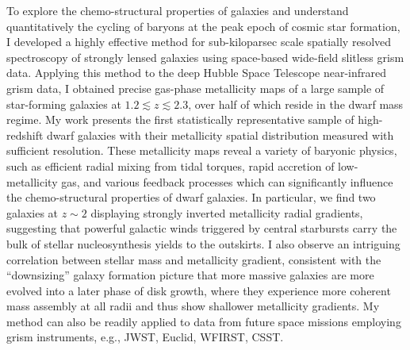 
To explore the chemo-structural properties of galaxies and understand quantitatively the cycling of baryons at
the peak epoch of cosmic star formation, I developed a highly effective method for sub-kiloparsec scale spatially
resolved spectroscopy of strongly lensed galaxies using space-based wide-field slitless grism data. Applying this
method to the deep Hubble Space Telescope near-infrared grism data, I obtained precise gas-phase metallicity maps
of a large sample of star-forming galaxies at $1.2\lesssim z\lesssim2.3$, over half of which reside in the dwarf
mass regime.  My work presents the first statistically representative sample of high-redshift dwarf galaxies with
their metallicity spatial distribution measured with sufficient resolution.  These metallicity maps reveal a
variety of baryonic physics, such as efficient radial mixing from tidal torques, rapid accretion of
low-metallicity gas, and various feedback processes which can significantly influence the chemo-structural
properties of dwarf galaxies.  In particular, we find two galaxies at $z\sim 2$ displaying strongly inverted
metallicity radial gradients, suggesting that powerful galactic winds triggered by central starbursts carry the
bulk of stellar nucleosynthesis yields to the outskirts.
I also observe an intriguing correlation between stellar mass and metallicity gradient, consistent with the 
``downsizing'' galaxy formation picture that more massive galaxies are more evolved into a later phase of disk 
growth, where they experience more coherent mass assembly at all radii and thus show shallower metallicity 
gradients.
My method can also be readily applied to data from future space missions
employing grism instruments, e.g., JWST, Euclid, WFIRST, CSST.

